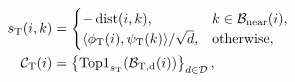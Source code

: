 \begin{equation}
 \begin{aligned}
 s_{\rm T}(i,k)&=\begin{cases}
 -\operatorname{dist}(i,k),&k\in\mathcal B_{\rm near}(i),\\
 \langle\phi_{\rm T}(i),\psi_{\rm T}(k)\rangle/\sqrt d,&\text{otherwise},
 \end{cases}\\
 \mathcal C_{\rm T}(i)&=\left\{\operatorname{Top1}_{s_{\rm T}}(\mathcal B_{\rm T,d}(i))\right\}_{d\in\mathcal D},
 \end{aligned}\label{eq:temporal_selection}
\end{equation}
